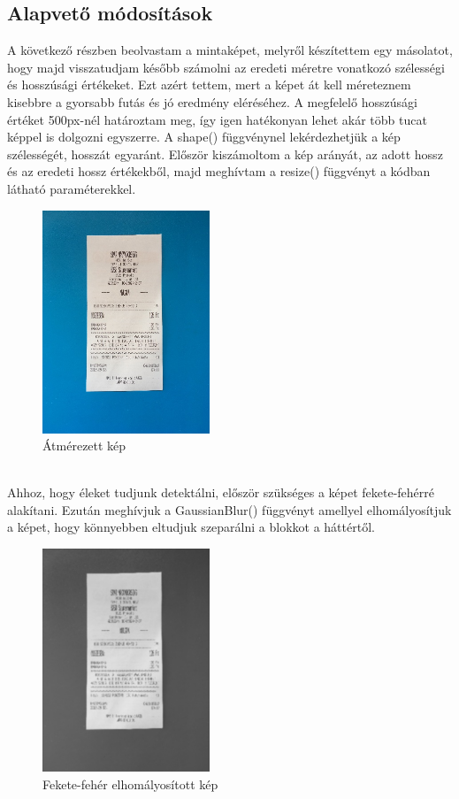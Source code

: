\documentclass[a4paper,12pt]{article}
\begin{document}
\subsection{Alapvető módosítások}
A következő részben beolvastam a mintaképet, melyről készítettem egy másolatot, hogy majd visszatudjam később számolni az eredeti méretre vonatkozó szélességi és hosszúsági értékeket. Ezt azért tettem, mert a képet át kell méreteznem kisebbre a gyorsabb futás és jó eredmény eléréséhez. A megfelelő hosszúsági értéket 500px-nél határoztam meg, így igen hatékonyan lehet akár több tucat képpel is dolgozni egyszerre. A shape()  függvénynel lekérdezhetjük a kép szélességét, hosszát egyaránt. Először kiszámoltom a kép arányát, az adott hossz és az eredeti hossz értékekből, majd meghívtam a resize() függvényt a kódban látható paraméterekkel.
\begin{figure}[h]
	\centering
	\includegraphics[width=5cm]{1d_resized}
	\caption{Átmérezett kép}
\end{figure}
\\Ahhoz, hogy éleket tudjunk detektálni, először szükséges a képet fekete-fehérré alakítani. Ezután meghívjuk a GaussianBlur() függvényt amellyel elhomályosítjuk a képet, hogy könnyebben eltudjuk szeparálni a blokkot a háttértől. 
\begin{figure}[h]
	\centering
	\includegraphics[width=5cm]{3d_blur}
	\caption{Fekete-fehér elhomályosított kép}
\end{figure}
\end{document}
